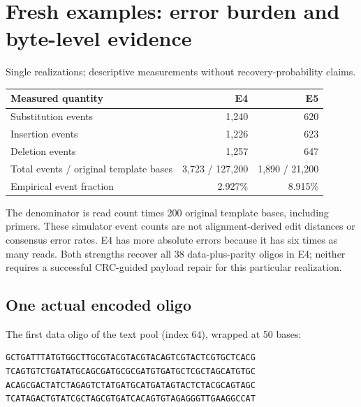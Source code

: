 \documentclass[11pt,a4paper]{article}
\newcommand{\pageheading}[2]{\clearpage\section{#1}{\color{muted}\small #2}\par\vspace{5pt}}
\begin{document}
\pageheading{Fresh examples: error burden and byte-level evidence}{Single realizations; descriptive measurements without recovery-probability claims.}
\begin{center}
\end{center}
{\small\begin{tabularx}{\linewidth}{Yrr}
\toprule Measured quantity & E4 & E5\\\midrule
Substitution events & 1,240 & 620\\
Insertion events & 1,226 & 623\\
Deletion events & 1,257 & 647\\
Total events / original template bases & 3,723 / 127,200 & 1,890 / 21,200\\
Empirical event fraction & 2.927\% & 8.915\%\\\bottomrule
\end{tabularx}}
The denominator is read count times 200 original template bases, including primers.
These simulator event counts are not alignment-derived edit distances or consensus
error rates. E4 has more absolute errors because it has six times as many reads. Both
strengths recover all 38 data-plus-parity oligos in E4; neither requires a successful
CRC-guided payload repair for this particular realization.

\subsection*{One actual encoded oligo}
The first data oligo of the text pool (index 64), wrapped at 50 bases:
\begin{lstlisting}
GCTGATTTATGTGGCTTGCGTACGTACGTACAGTCGTACTCGTGCTCACG
TCAGTGTCTGATATGCAGCGATGCGCGATGTGATGCTCGCTAGCATGTGC
ACAGCGACTATCTAGAGTCTATGATGCATGATAGTACTCTACGCAGTAGC
TCATAGACTGTATCGCTAGCGTGATCACAGTGTAGAGGGTTGAAGGCCAT
\end{lstlisting}
\end{document}
